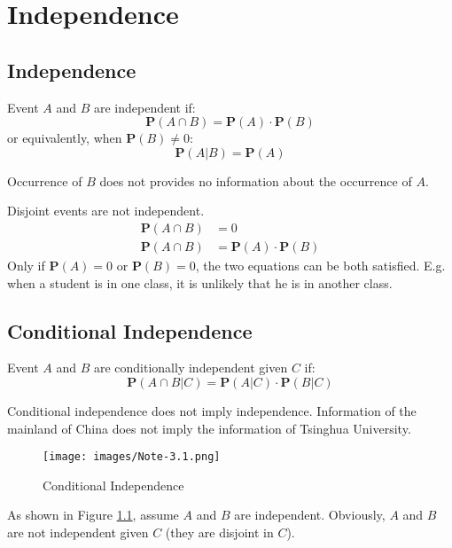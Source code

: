 \chapter{Independence}
\section{Independence}
\begin{definition}[Independence]
    Event $A$ and $B$ are independent if:
    \begin{equation}
        \mathbf{P}(A \cap B) = \mathbf{P}(A) \cdot \mathbf{P}(B)
    \end{equation}
    or equivalently, when $\mathbf{P}(B) \neq 0$:
    \begin{equation}
        \mathbf{P}(A|B) = \mathbf{P}(A)
    \end{equation}
\end{definition}
Occurrence of $B$ does not provides no information about the occurrence of $A$.
\begin{remark}
    Disjoint events are not independent.
    \begin{equation}
    \begin{aligned}
        \mathbf{P}(A \cap B) &= 0 \\
        \mathbf{P}(A \cap B) &= \mathbf{P}(A) \cdot \mathbf{P}(B)
    \end{aligned}
    \end{equation}
    Only if $\mathbf{P}(A) = 0$ or $\mathbf{P}(B) = 0$, the two equations can be both satisfied. E.g. when a student is in one class, it is unlikely that he is in another class.
\end{remark}

\section{Conditional Independence}
\begin{definition}
    Event $A$ and $B$ are conditionally independent given $C$ if:
    \begin{equation}
        \mathbf{P}(A \cap B | C) = \mathbf{P}(A | C) \cdot \mathbf{P}(B | C)
    \end{equation}
\end{definition}
\begin{remark}
    Conditional independence does not imply independence. Information of the mainland of China does not imply the information of Tsinghua University.
\begin{figure}[H]
    \centering
    \texttt{[image: images/Note-3.1.png]}
    \caption{Conditional Independence}
    \label{fig:conditional-independence}
\end{figure}
As shown in Figure \ref{fig:conditional-independence}, assume $A$ and $B$ are independent. Obviously, $A$ and $B$ are not independent given $C$ (they are disjoint in $C$).
\end{remark}

